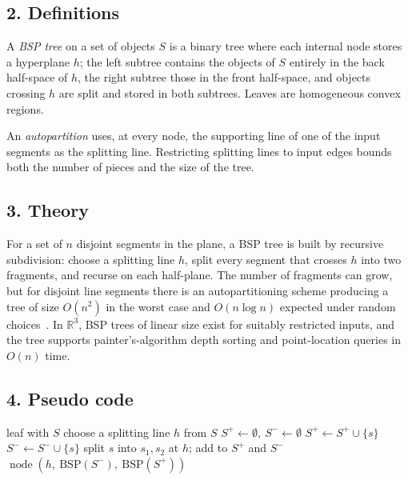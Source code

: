 \subsection{2. Definitions}

\begin{definition}\label{def:bsp_tree}
A \emph{BSP tree} on a set of objects $S$ is a binary tree where each internal node stores a hyperplane $h$; the left subtree contains the objects of $S$ entirely in the back half-space of $h$, the right subtree those in the front half-space, and objects crossing $h$ are split and stored in both subtrees. Leaves are homogeneous convex regions.
\end{definition}

\begin{definition}[Autopartition]\label{def:bsp_autopartition}
An \emph{autopartition} uses, at every node, the supporting line of one of the input segments as the splitting line. Restricting splitting lines to input edges bounds both the number of pieces and the size of the tree.
\end{definition}

\subsection{3. Theory}
For a set of $n$ disjoint segments in the plane, a BSP tree is built by recursive subdivision: choose a splitting line $h$, split every segment that crosses $h$ into two fragments, and recurse on each half-plane. The number of fragments can grow, but for disjoint line segments there is an autopartitioning scheme producing a tree of size $O(n^2)$ in the worst case and $O(n \log n)$ expected under random choices~\cite{berg2008}. In $\mathbb{R}^3$, BSP trees of linear size exist for suitably restricted inputs, and the tree supports painter's-algorithm depth sorting and point-location queries in $O(n)$ time.

\subsection{4. Pseudo code}
\begin{algorithmic}
        \State \Return leaf with $S$
    \EndIf
    \State choose a splitting line $h$ from $S$
    \State $S^+ \gets \emptyset,\ S^- \gets \emptyset$
         \State $S^+ \gets S^+ \cup \{s\}$
         \State $S^- \gets S^- \cup \{s\}$
        \Else \State split $s$ into $s_1, s_2$ at $h$; add to $S^+$ and $S^-$
        \EndIf
    \EndFor
    \State \Return $\operatorname{node}(h,\ \mathrm{BSP}(S^-),\ \mathrm{BSP}(S^+))$
\EndFunction
\end{algorithmic}

